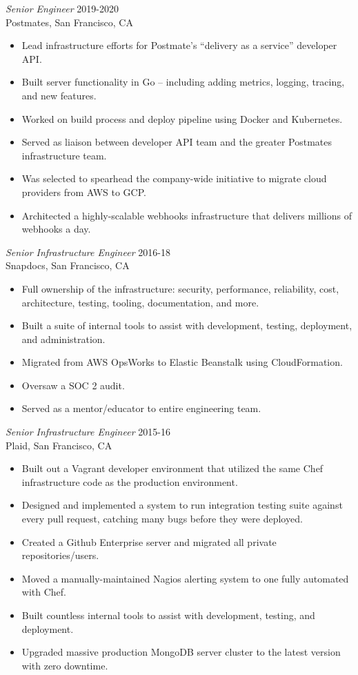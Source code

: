 \documentclass[line,margin]{res}
\begin{document}
\begin{resume}
  {\sl Senior Engineer}  \hfill 2019-2020 \\
  Postmates,
  San Francisco, CA
  \begin{itemize}  \itemsep -2pt %
    \item Lead infrastructure efforts for Postmate's ``delivery as a service'' developer API.
    \item Built server functionality in Go -- including adding metrics, logging, tracing, and new features.
    \item Worked on build process and deploy pipeline using Docker and Kubernetes.
    \item Served as liaison between developer API team and the greater Postmates infrastructure team.
    \item Was selected to spearhead the company-wide initiative to migrate cloud providers from AWS to GCP.
    \item Architected a highly-scalable webhooks infrastructure that delivers millions of webhooks a day.
  \end{itemize}

  {\sl Senior Infrastructure Engineer}  \hfill 2016-18 \\
  Snapdocs,
  San Francisco, CA
  \begin{itemize}  \itemsep -2pt %
    \item Full ownership of the infrastructure: security, performance, reliability, cost, architecture, testing, tooling, documentation, and more.
    \item Built a suite of internal tools to assist with development, testing, deployment, and administration.
    \item Migrated from AWS OpsWorks to Elastic Beanstalk using CloudFormation.
    \item Oversaw a SOC 2 audit.
    \item Served as a mentor/educator to entire engineering team.
  \end{itemize}

  {\sl Senior Infrastructure Engineer}  \hfill 2015-16 \\
  Plaid,
  San Francisco, CA
  \begin{itemize}  \itemsep -2pt %
    \item Built out a Vagrant developer environment that utilized the same Chef infrastructure code as the production environment.
    \item Designed and implemented a system to run integration testing suite against every pull request, catching many bugs before they were deployed.
    \item Created a Github Enterprise server and migrated all private repositories/users.
    \item Moved a manually-maintained Nagios alerting system to one fully automated with Chef.
    \item Built countless internal tools to assist with development, testing, and deployment.
    \item Upgraded massive production MongoDB server cluster to the latest version with zero downtime.
  \end{itemize}


\end{resume}
\end{document}

